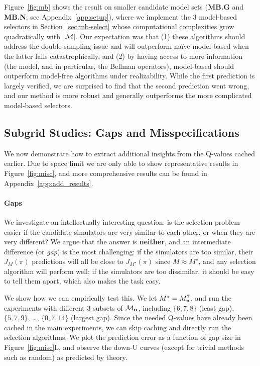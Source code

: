 Figure~\ref{fig:mb} shows the result on smaller candidate model sets (\textbf{MB.G} and \textbf{MB.N}; see Appendix~\ref{app:setup}), where we implement the 3 model-based selectors in Section~\ref{sec:mb-select} whose computational complexities grow quadratically with $|\mathcal{M}|$. Our expectation was that (1) these algorithms should address the double-sampling issue and will outperform na\"ive model-based when the latter fails catastrophically, and (2) by having access to more information (the model, and in particular, the Bellman operators), model-based should outperform model-free algorithms under realizability. While the first prediction is largely verified, we are surprised to find that the second prediction went wrong, and our \lstd method is more robust and generally outperforms the more complicated model-based selectors. 

%

\subsection{Subgrid Studies: Gaps and Misspecifications} \label{sec:subgrid}

We now demonstrate how to extract additional insights from the Q-values cached earlier. Due to space limit we are only able to show  representative results in Figure~\ref{fig:misc}, and more comprehensive results can be found in Appendix~\ref{app:add_results}.

\paragraph{Gaps} We investigate an intellectually interesting question: is the selection problem easier if the candidate simulators are very similar to each other, or when they are very different? We argue that the answer is \textbf{neither}, and an intermediate difference (or \textit{gap}) is the most challenging: if the simulators are too similar, their $J_M(\pi)$ predictions will all be close to $J_{M^\star}(\pi)$ since $M\approx M^\star$, and any selection algorithm will perform well; if the simulators are too dissimilar, it should be easy  to tell them apart, which also makes the task easy. 

We show how we can empirically test this. We let $M^\star = M_{\mathbf{n}}^7$, and run the experiments with different 3-subsets of $\mathcal{M}_{\mathbf{n}}$, including  $\{6,7,8\}$ (least gap), $\{5,7,9\}$, \ldots, $\{0, 7, 14\}$ (largest gap). Since the needed Q-values have already been cached in the main experiments, we can skip  caching and directly run the selection algorithms. We plot the prediction error as a function of gap size in Figure~\ref{fig:misc}L, and observe the down-U  curves (except for trivial methods such as  random) as predicted by theory. 

